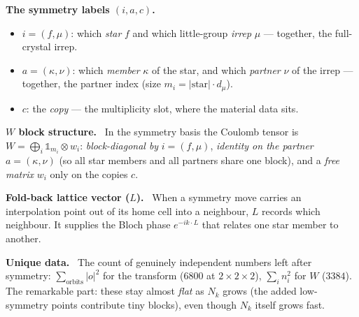 \documentclass[11pt]{article}
\newcommand{\term}[1]{\medskip\noindent\textbf{#1.}\ }
\begin{document}
\term{The symmetry labels $(i,a,c)$}
\begin{itemize}[leftmargin=1.6em,topsep=2pt]
  \item $i=(f,\mu)$: which \emph{star} $f$ and which little-group \emph{irrep} $\mu$ --- together, the
        full-crystal irrep.
  \item $a=(\kappa,\nu)$: which \emph{member} $\kappa$ of the star, and which \emph{partner} $\nu$ of
        the irrep --- together, the partner index (size $m_i=|\text{star}|\cdot d_\mu$).
  \item $c$: the \emph{copy} --- the multiplicity slot, where the material data sits.
\end{itemize}

\term{$W$ block structure} In the symmetry basis the Coulomb tensor is
$W=\bigoplus_i \mathbb{1}_{m_i}\otimes w_i$: \emph{block-diagonal by} $i=(f,\mu)$, \emph{identity on the
partner} $a=(\kappa,\nu)$ (so all star members and all partners share one block), and a \emph{free
matrix} $w_i$ only on the copies $c$.

\term{Fold-back lattice vector ($L$)} When a symmetry move carries an interpolation point out of its
home cell into a neighbour, $L$ records which neighbour. It supplies the Bloch phase $e^{-ik\cdot L}$
that relates one star member to another.

\term{Unique data} The count of genuinely independent numbers left after symmetry:
$\sum_{\text{orbits}}|o|^2$ for the transform ($6800$ at $2\times2\times2$), $\sum_i n_i^2$ for $W$
($3384$). The remarkable part: these stay almost \emph{flat} as $N_k$ grows (the added low-symmetry
points contribute tiny blocks), even though $N_k$ itself grows fast.
\end{document}
